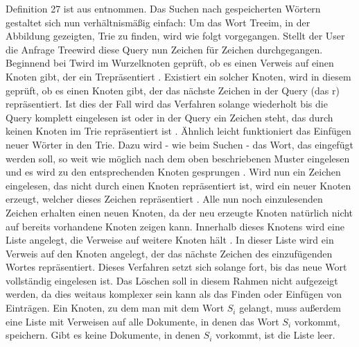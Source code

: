 Definition 27 ist aus \cite{Trie_wiki} entnommen.
\newline \newline
Das Suchen nach gespeicherten Wörtern gestaltet sich nun verhältnismäßig einfach: Um das Wort \glqq Tree\grqq im, in der Abbildung gezeigten, Trie zu finden, wird wie folgt vorgegangen.
\newline 
Stellt der User die Anfrage \glqq Tree\grqq wird diese Query nun Zeichen für Zeichen durchgegangen. Beginnend bei \glqq T\grqq wird im Wurzelknoten geprüft, ob es einen Verweis auf einen Knoten gibt, der ein \glqq T\grqq repräsentiert \cite{trie_Abb}. Existiert ein solcher Knoten, wird in diesem geprüft, ob es einen Knoten gibt, der das nächste Zeichen in der Query (das \glqq r\grqq) repräsentiert. Ist dies der Fall wird das Verfahren solange wiederholt bis die Query komplett eingelesen ist oder in der Query ein Zeichen steht, das durch keinen Knoten im Trie repräsentiert ist \cite{trie_Abb} \cite{Trie_Blog}.
\newline \newline
Ähnlich leicht funktioniert das Einfügen neuer Wörter in den Trie. Dazu wird - wie beim Suchen - das Wort, das eingefügt werden soll, so weit wie möglich nach dem oben beschriebenen Muster eingelesen und es wird zu den entsprechenden Knoten gesprungen \cite{trie_Abb} \cite{Trie_Blog}. Wird nun ein Zeichen eingelesen, das nicht durch einen Knoten repräsentiert ist, wird ein neuer Knoten erzeugt, welcher dieses Zeichen repräsentiert \cite{trie_Abb}. Alle nun noch einzulesenden Zeichen erhalten einen neuen Knoten, da der neu erzeugte Knoten natürlich nicht auf bereits vorhandene Knoten zeigen kann. Innerhalb dieses Knotens wird eine Liste angelegt, die Verweise auf weitere Knoten hält \cite{trie_Abb}. In dieser Liste wird ein Verweis auf den Knoten angelegt, der das nächste Zeichen des einzufügenden Wortes repräsentiert. Dieses Verfahren setzt sich solange fort, bis das neue Wort vollständig eingelesen ist.
\newline \newline
Das Löschen soll in diesem Rahmen nicht aufgezeigt werden, da dies weitaus komplexer sein kann als das Finden oder Einfügen von Einträgen.
\newline \newline
Ein Knoten, zu dem man mit dem Wort $S_i$ gelangt, muss außerdem eine Liste mit Verweisen auf alle Dokumente, in denen das Wort $S_i$ vorkommt, speichern. Gibt es keine Dokumente, in denen $S_i$ vorkommt, ist die Liste leer.


